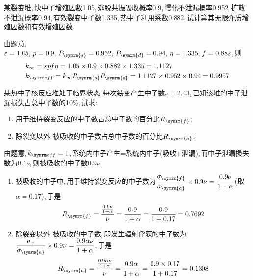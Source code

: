 \begin{exercise}
    某裂变堆,\,快中子增殖因数1.05,\,逃脱共振吸收概率0.9,\,慢化不泄漏概率0.952,\,扩散不泄漏概率0.94,\,有效裂变中子数1.335,\,热中子利用系数0.882,\,试计算其无限介质增殖因数和有效增殖因数.\,
    \begin{solution}
        由题意,\,$\varepsilon = 1.05,\,p=0.9,\,P_{\symrm{s}}=0.952,\,P_{\symrm{d}}=0.94,\,\eta=1.335,\,f=0.882$,\,则
        \begin{align*}
            &k_{\infty} = \varepsilon p f \eta = 1.05 \times 0.9 \times 0.882 \times 1.335 = 1.1127 \\
            &\keff = k_{\infty} P_{\symrm{s}} P_{\symrm{d}} = 1.1127 \times 0.952 \times 0.94 = 0.9957
        \end{align*}
    \end{solution}
\end{exercise}

\begin{exercise}
    某热中子核反应堆处于临界状态,\,每次裂变产生中子数$\nu = 2.43$,\,已知该堆的中子泄漏损失占总中子数的10\%,\,试求:\,
    \begin{enumerate}[(1)]
        \item 用于维持裂变反应的中子数占总中子数的百分比$R_{\symrm{f}}$;
        \item 除裂变以外,\,被吸收的中子数占总中子数的百分比$R_{\symrm{a}}$; 
    \end{enumerate}
    \begin{solution}
        由题意,\,$\keff = 1$,\,系统内中子产生=系统内中子(吸收+泄漏),\,而中子泄漏损失数为$0.1\nu$,\,则被吸收的中子数$0.9\nu$.
        \begin{enumerate}[(1)]
            \item 被吸收的中子中,\,用于维持裂变反应的中子数为$\dfrac{\sigma_{\symrm{f}}}{\sigma_{\symrm{a}}} \times 0.9\nu = \dfrac{0.9\nu}{1+\alpha}$(取$\alpha = 0.17$),\,于是
            \begin{equation*}
                R_{\symrm{f}} = \frac{\frac{0.9\nu}{1+\alpha}}{\nu} = \frac{0.9}{1+\alpha} = \frac{0.9}{1+0.17} = 0.7692
            \end{equation*}
            \item 除裂变以外,\,被吸收的中子数,\,即发生辐射俘获的中子数为$\dfrac{\sigma_{\gamma}}{\sigma_{\symrm{a}}} \times 0.9\nu = \dfrac{0.9 \alpha \nu}{1+\alpha}$,\,于是
            \begin{equation*}
                R_{\symrm{a}} = \frac{\frac{0.9 \alpha \nu}{1+\alpha}}{\nu} = \frac{0.9\alpha}{1+\alpha} = \frac{0.9\times 0.17}{1+0.17} = 0.1308
            \end{equation*}
        \end{enumerate}
    \end{solution}
\end{exercise}

